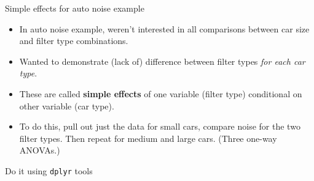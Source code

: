 \documentclass[unknownkeysallowed]{beamer}\usepackage[]{graphicx}\usepackage[]{color}
\makeatletter
\newcommand{\hlstr}[1]{\textcolor[rgb]{0.192,0.494,0.8}{#1}}%
\newcommand{\hlopt}[1]{\textcolor[rgb]{0,0,0}{#1}}%
\newcommand{\hlstd}[1]{\textcolor[rgb]{0.345,0.345,0.345}{#1}}%
\newcommand{\hlkwc}[1]{\textcolor[rgb]{0.333,0.667,0.333}{#1}}%
\newcommand{\hlkwd}[1]{\textcolor[rgb]{0.737,0.353,0.396}{\textbf{#1}}}%
\newenvironment{kframe}{%
 \def\at@end@of@kframe{}%
 \ifinner\ifhmode%
  \def\at@end@of@kframe{\end{minipage}}%
  \begin{minipage}{\columnwidth}%
 \fi\fi%
 \def\FrameCommand##1{\hskip\@totalleftmargin \hskip-\fboxsep
 \colorbox{shadecolor}{##1}\hskip-\fboxsep
     \hskip-\linewidth \hskip-\@totalleftmargin \hskip\columnwidth}%
 \MakeFramed {\advance\hsize-\width
   \@totalleftmargin\z@ \linewidth\hsize
   \@setminipage}}%
 {\par\unskip\endMakeFramed%
 \at@end@of@kframe}
\newenvironment{knitrout}{}{} %
\makeatother
\begin{document}
\begin{frame}[fragile]{Simple effects for auto noise example}
  \begin{itemize}
  \item In auto noise example, weren't interested in all comparisons
    between car size and filter type combinations.
  \item Wanted to demonstrate (lack of) difference between filter types
    \emph{for each car type}. 

  \item These are called \textbf{simple effects} of one variable
    (filter type)
    conditional on other variable (car type).

  \item To do this, pull out just the data for small cars, compare
    noise for the two filter types. Then repeat for medium and large
    cars. (Three one-way ANOVAs.)

  \end{itemize}
\end{frame}

\begin{frame}[fragile]{Do it using \texttt{dplyr} tools}
  
  
\end{frame}
\end{document}
